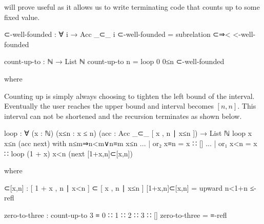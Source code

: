 \documentclass[./Thesis.tex]{subfiles}
\begin{document}
will prove useful as it allows us to write terminating code that counts up to
some fixed value.
\begin{code}
  ⊂-well-founded : ∀ {i} → Acc _⊂_ i
  ⊂-well-founded = subrelation ⊂⇒< <-well-founded

  count-up-to : ℕ → List ℕ
  count-up-to n = loop 0 0≤n ⊂-well-founded
\end{code}
\begin{code}[hide]
    where
\end{code}
Counting up is simply always choosing to tighten the left bound of the interval.
Eventually the user reaches the upper bound and interval becomes $[ n, n ]$.
This interval can not be shortened and the recursion terminates as shown below.
\begin{code}
    loop : ∀ (x : ℕ) (x≤n : x ≤ n) (acc : Acc _⊂_ [ x , n ∣ x≤n ]) → List ℕ
    loop x x≤n (acc next) with n≤m⇒n<m∨n≡m x≤n
    ... | or₂ x≡n = x ∷ []
    ... | or₁ x<n = x ∷ loop (1 + x) x<n (next [1+x,n]⊂[x,n])
\end{code}
\begin{code}[hide]
      where
\end{code}
\begin{code}
      [1+x,n]⊂[x,n] : [ 1 + x , n ∣ x<n ] ⊂ [ x , n ∣ x≤n ]
      [1+x,n]⊂[x,n] = upward n<1+n ≤-refl
\end{code}
\begin{code}
  zero-to-three : count-up-to 3 ≡ 0 ∷ 1 ∷ 2 ∷ 3 ∷ []
  zero-to-three = ≡-refl
\end{code}
\end{document}
